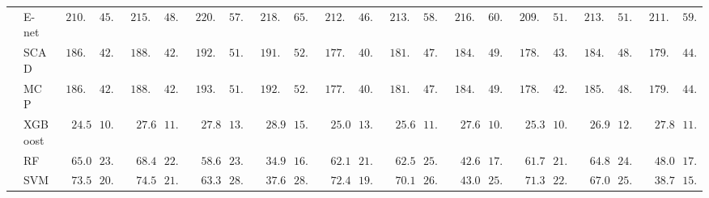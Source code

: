 \begin{tabular}{ll|ll|llllll|llllll|llllll}
 & E-net  & $\phantom{0}210.73$ & $\phantom{0}45.58$ & $\phantom{0}215.76$ & $\phantom{0}48.53$ & $\phantom{0}220.48$ & $\phantom{0}57.72$ & $\phantom{0}218.03$ & $\phantom{0}65.53$ & $\phantom{0}212.25$ & $\phantom{0}46.78$ & $\phantom{0}213.85$ & $\phantom{0}58.10$ & $\phantom{0}216.11$ & $\phantom{0}60.55$ & $\phantom{0}209.22$ & $\phantom{0}51.32$ & $\phantom{0}213.95$ & $\phantom{0}51.95$ & $\phantom{0}211.06$ & $\phantom{0}59.45$ \\
 & SCAD  & $\phantom{0}186.08$ & $\phantom{0}42.85$ & $\phantom{0}188.83$ & $\phantom{0}42.61$ & $\phantom{0}192.99$ & $\phantom{0}51.31$ & $\phantom{0}191.85$ & $\phantom{0}52.87$ & $\phantom{0}177.39$ & $\phantom{0}40.76$ & $\phantom{0}181.26$ & $\phantom{0}47.99$ & $\phantom{0}184.72$ & $\phantom{0}49.08$ & $\phantom{0}178.86$ & $\phantom{0}43.13$ & $\phantom{0}184.43$ & $\phantom{0}48.19$ & $\phantom{0}179.24$ & $\phantom{0}44.33$ \\
 & MCP  & $\phantom{0}186.24$ & $\phantom{0}42.64$ & $\phantom{0}188.90$ & $\phantom{0}42.41$ & $\phantom{0}193.11$ & $\phantom{0}51.20$ & $\phantom{0}192.05$ & $\phantom{0}52.85$ & $\phantom{0}177.88$ & $\phantom{0}40.13$ & $\phantom{0}181.41$ & $\phantom{0}47.75$ & $\phantom{0}184.97$ & $\phantom{0}49.94$ & $\phantom{0}178.78$ & $\phantom{0}42.83$ & $\phantom{0}185.68$ & $\phantom{0}48.82$ & $\phantom{0}179.27$ & $\phantom{0}44.45$ \\
 & XGBoost  & $\phantom{00}24.56$ & $\phantom{0}10.14$ & $\phantom{00}27.63$ & $\phantom{0}11.80$ & $\phantom{00}27.83$ & $\phantom{0}13.69$ & $\phantom{00}28.94$ & $\phantom{0}15.45$ & $\phantom{00}25.02$ & $\phantom{0}13.49$ & $\phantom{00}25.64$ & $\phantom{0}11.76$ & $\phantom{00}27.61$ & $\phantom{0}10.74$ & $\phantom{00}25.35$ & $\phantom{0}10.61$ & $\phantom{00}26.94$ & $\phantom{0}12.12$ & $\phantom{00}27.80$ & $\phantom{0}11.71$ \\
 & RF  & $\phantom{00}65.08$ & $\phantom{0}23.82$ & $\phantom{00}68.40$ & $\phantom{0}22.10$ & $\phantom{00}58.64$ & $\phantom{0}23.79$ & $\phantom{00}34.99$ & $\phantom{0}16.74$ & $\phantom{00}62.17$ & $\phantom{0}21.72$ & $\phantom{00}62.53$ & $\phantom{0}25.92$ & $\phantom{00}42.63$ & $\phantom{0}17.45$ & $\phantom{00}61.70$ & $\phantom{0}21.24$ & $\phantom{00}64.87$ & $\phantom{0}24.66$ & $\phantom{00}48.05$ & $\phantom{0}17.66$ \\
 & SVM  & $\phantom{00}73.56$ & $\phantom{0}20.85$ & $\phantom{00}74.57$ & $\phantom{0}21.07$ & $\phantom{00}63.36$ & $\phantom{0}28.47$ & $\phantom{00}37.65$ & $\phantom{0}28.71$ & $\phantom{00}72.48$ & $\phantom{0}19.71$ & $\phantom{00}70.16$ & $\phantom{0}26.74$ & $\phantom{00}43.02$ & $\phantom{0}25.66$ & $\phantom{00}71.37$ & $\phantom{0}22.38$ & $\phantom{00}67.09$ & $\phantom{0}25.17$ & $\phantom{00}38.73$ & $\phantom{0}15.91$ \\\hline

\end{tabular}

